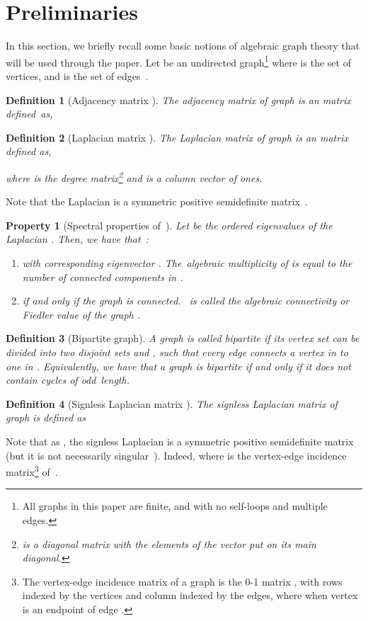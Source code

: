 \documentclass[letterpaper,9pt,twocolumn]{autart}
\newtheorem{definition}{\textbf{Definition}}
\newtheorem{property}{\textbf{Property}}
\begin{document}
\section{Preliminaries}\label{Sec:prel}
In this section, we briefly recall some basic notions of algebraic graph
theory that will be used through the paper.
Let  be an undirected graph\footnote{All graphs in this paper
are finite, and with no self-loops and multiple edges.} where
 is the set of vertices, and  is the set of edges~\cite{GodsilRo_book01}.
\begin{definition}[Adjacency matrix ]\label{Def1}
The adjacency matrix  of graph  is an 
matrix defined~as, 
\hfill
\end{definition}
\begin{definition}[Laplacian matrix ]
The Laplacian matrix of graph  is an  matrix defined as,

where  is the degree 
matrix\footnote{ is a diagonal matrix with the
elements of the vector  put on its main diagonal.} and  is a
column vector of  ones.~\hfill
\end{definition}
Note that the Laplacian  is a symmetric positive semidefinite matrix~\cite{Mohar_GRCA91}.
\begin{property}[Spectral properties of\, ]\label{Sp_propL}
Let  be the
ordered eigenvalues of the Laplacian . Then, we have that~\cite{Abreu_LAA07}:
\begin{enumerate}
\item  with corresponding eigenvector . The~algebraic multiplicity of  is equal to the number of connected
components in .
\item  if and only if the graph 
  is connected. ~is called the
  \emph{algebraic connectivity} or \emph{Fiedler value} of the graph
  .~\hfill\end{enumerate}
\end{property}
\begin{definition}[Bipartite graph] A graph  is called bipartite if its vertex set  can be divided into
two disjoint sets  and , such that every edge connects a vertex in
 to one in . Equivalently, we have that a graph is bipartite if and only if it does not contain cycles of odd~length.~\hfill
\end{definition}



\begin{definition}[Signless Laplacian matrix ] The signless Laplacian matrix of graph  is defined as \cite{CvetkovicRoSi_LAA07}

\hfill
\end{definition}
Note that as , the signless Laplacian  is a
symmetric positive semidefinite matrix (but it is not necessarily \mbox{singular}~\cite{BrouwerHa_book12}).
Indeed,  where  is
the vertex-edge incidence matrix\footnote{The vertex-edge incidence
matrix of a graph  is the \mbox{0-1} matrix , with rows indexed by
the vertices and column indexed by the edges, where  when
vertex  is an endpoint of edge .} of~.
\end{document}
